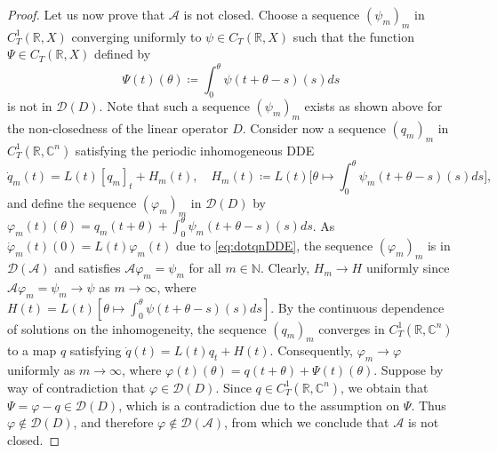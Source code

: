 \documentclass[english]{myarticle}
\begin{document}
\begin{sloppypar}
\begin{proof}
Let us now prove that $\mathcal{A}$ is not closed. Choose a sequence $(\psi_m)_m$ in $C_T^1(\mathbb{R}, X)$ converging uniformly to $\psi \in C_T(\mathbb{R}, X)$ such that the function $\Psi \in C_T(\mathbb{R},X)$ defined by
\begin{equation} \label{eq:Psiappendix}
    \Psi(t)(\theta) \coloneqq \int_0^\theta \psi(t+\theta-s)(s) ds
\end{equation}
is not in $\mathcal{D}(D)$. Note that such a sequence $(\psi_m)_m$ exists as shown above for the non-closedness of the linear operator $D$. Consider now a sequence $(q_m)_m$ in $C_T^1(\mathbb{R}, \mathbb{C}^n)$ satisfying the periodic inhomogeneous DDE
\begin{equation} \label{eq:dotqnDDE}
    \dot{q}_m(t) = L(t)[q_m]_t + H_m(t), \quad H_m(t) \coloneqq L(t)\bigg [\theta \mapsto \int_0^\theta \psi_m(t+\theta-s)(s) ds \bigg],
\end{equation}
and define the sequence $(\varphi_m)_m$ in $\mathcal{D}(D)$ by $\varphi_m(t)(\theta) = q_m(t+\theta) + \int_0^\theta \psi_m(t+\theta-s)(s) ds$. As $\dot{\varphi}_m(t)(0) = L(t)\varphi_m(t)$ due to \eqref{eq:dotqnDDE}, the sequence $(\varphi_m)_m$ is in $\mathcal{D}(\mathcal{A})$ and satisfies $\mathcal{A} \varphi_m = \psi_m$ for all $m \in \mathbb{N}$. Clearly, $H_m \to H$ uniformly since $\mathcal{A}\varphi_m = \psi_m \to \psi$ as $m \to \infty$, where $H(t) = L(t)[\theta \mapsto \int_0^\theta \psi(t+\theta-s)(s) ds]$. By the continuous dependence of solutions on the inhomogeneity, the sequence $(q_m)_m$ converges in $C_T^1(\mathbb{R},\mathbb{C}^n)$ to a map $q$ satisfying $\dot{q}(t) = L(t)q_t + H(t)$. Consequently, $\varphi_m \to \varphi$ uniformly as $m \to \infty$, where $\varphi(t)(\theta) = q(t+\theta) + \Psi(t)(\theta)$. Suppose by way of contradiction that $\varphi \in \mathcal{D}(D)$. Since $q \in C_T^1(\mathbb{R},\mathbb{C}^n)$, we obtain that $\Psi = \varphi - q \in \mathcal{D}(D)$, which is a contradiction due to the assumption on $\Psi$. Thus $\varphi \notin \mathcal{D}(D)$, and therefore $\varphi \notin \mathcal{D}(\mathcal{A})$, from which we conclude that $\mathcal{A}$ is not closed.
\end{proof}


\end{sloppypar}
\end{document}
